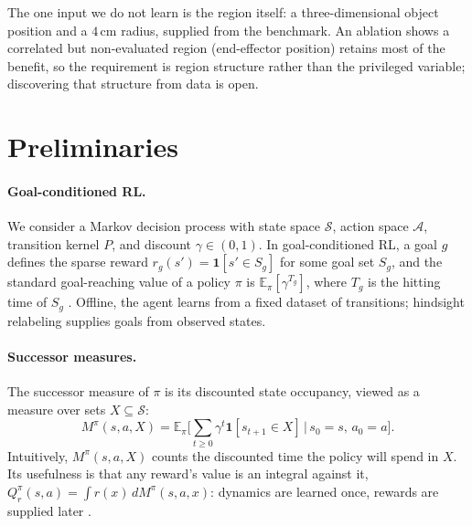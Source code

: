 \documentclass{article}
\newcommand{\E}{\mathbb{E}}
\newcommand{\ind}[1]{\mathbf{1}\!\left[#1\right]}
\begin{document}
The one input we do not learn is the region itself: a three-dimensional object
position and a $4$\,cm radius, supplied from the benchmark. An ablation shows a
correlated but non-evaluated region (end-effector position) retains most of the
benefit, so the requirement is region structure rather than the privileged
variable; discovering that structure from data is open.

\section{Preliminaries}
\label{sec:prelim}

\paragraph{Goal-conditioned RL.}
We consider a Markov decision process with state space $\mathcal{S}$, action
space $\mathcal{A}$, transition kernel $P$, and discount $\gamma\in(0,1)$. In
goal-conditioned RL, a goal $g$ defines the sparse reward
$r_g(s')=\ind{s'\in S_g}$ for some goal set $S_g$, and the standard
goal-reaching value of a policy $\pi$ is $\E_\pi[\gamma^{T_g}]$, where $T_g$ is
the hitting time of $S_g$
\citep{kaelbling1993learning,andrychowicz2017hindsight}. Offline, the agent
learns from a fixed dataset of transitions; hindsight relabeling supplies goals
from observed states.

\paragraph{Successor measures.}
The successor measure of $\pi$ is its discounted state occupancy, viewed as a
measure over sets $X\subseteq\mathcal{S}$:
\begin{equation}
\label{eq:sm}
M^{\pi}(s,a,X)
=
\E_{\pi}\!\Big[
\sum_{t\ge 0}\gamma^{t}\ind{s_{t+1}\in X}
\,\Big|\,
s_{0}=s,\,a_{0}=a
\Big].
\end{equation}
Intuitively, $M^\pi(s,a,X)$ counts the discounted time the policy will spend in
$X$. Its usefulness is that any reward's value is an integral against it,
$Q_r^{\pi}(s,a)=\int r(x)\,dM^{\pi}(s,a,x)$: dynamics are learned once, rewards
are supplied later \citep{dayan1993improving,blier2021learning}.
\end{document}
